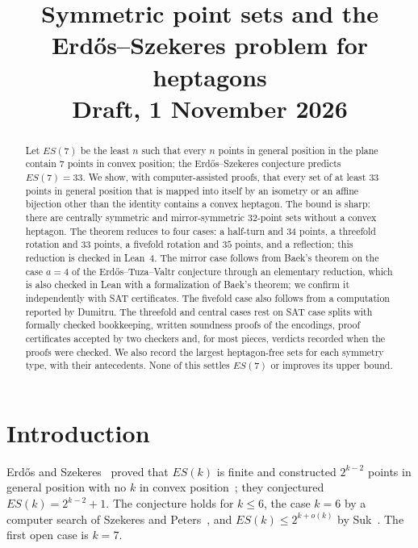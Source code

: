 \documentclass[11pt]{article}
\title{Symmetric point sets and the Erd\H{o}s--Szekeres problem for heptagons\\[2pt]\large Draft, 1 November 2026}
\author{}
\date{}
\theoremstyle{remark}
\begin{document}
\maketitle

\begin{abstract}
Let $ES(7)$ be the least $n$ such that every $n$ points in general position in the plane contain $7$ points in convex
position; the Erd\H{o}s--Szekeres conjecture predicts $ES(7)=33$. We show, with computer-assisted proofs, that every set
of at least $33$ points in general position that is mapped into itself by an isometry or an affine bijection other than
the identity contains a convex heptagon. The bound is sharp: there are centrally symmetric and mirror-symmetric
$32$-point sets without a convex heptagon. The theorem reduces to four cases: a half-turn and $34$ points, a threefold
rotation and $33$ points, a fivefold rotation and $35$ points, and a reflection; this reduction is checked in Lean~4.
The mirror case follows from Baek's theorem on the case $a=4$ of the Erd\H{o}s--Tuza--Valtr conjecture through an
elementary reduction, which is also checked in Lean with a formalization of Baek's theorem; we confirm it independently
with SAT certificates. The fivefold case also follows from a computation reported by Dumitru. The threefold and central
cases rest on SAT case splits with formally checked bookkeeping, written soundness proofs of the encodings, proof
certificates accepted by two checkers and, for most pieces, verdicts recorded when the proofs were checked. We also
record the largest heptagon-free sets for each symmetry type, with their antecedents. None of this settles $ES(7)$ or
improves its upper bound.
\end{abstract}

\section{Introduction}
Erd\H{o}s and Szekeres~\cite{ES35} proved that $ES(k)$ is finite and constructed $2^{k-2}$ points in general position with
no $k$ in convex position~\cite{ES61}; they conjectured $ES(k)=2^{k-2}+1$. The conjecture holds for $k\le 6$, the case
$k=6$ by a computer search of Szekeres and Peters~\cite{SP06}, and $ES(k)\le 2^{k+o(k)}$ by Suk~\cite{Suk17}. The first
open case is $k=7$.
\end{document}
